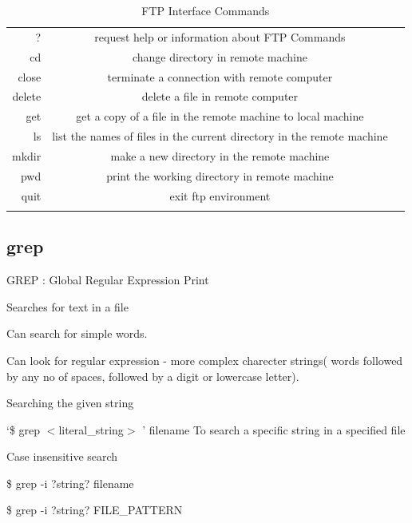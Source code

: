 \documentclass{article}
\begin{document}
\begin{table}[htb]
\caption {FTP Interface Commands}
\label {Common Commands}
\begin{tabular}{rcc}
\noalign{\smallskip}\hline\hline\noalign{\smallskip}
? & request help or information about FTP Commands\\
cd & change directory in remote machine\\
close & terminate a connection with remote computer\\
delete & delete a file in remote computer\\
get & get a copy of a file in the remote machine to local machine\\
ls & list the names of files in the current directory in the remote machine\\
mkdir & make a new directory in the remote machine\\
pwd & print the working directory in remote machine\\
quit & exit ftp environment\\
\noalign{\smallskip}\hline\hline\noalign{\smallskip}

\end{tabular}
\end{table}

\subsection{grep}

GREP : Global Regular Expression Print

 	\hspace{10mm}Searches for text in a file
	
 	\hspace{10mm}Can search for simple words.
	
 	\hspace{10mm}Can look for regular expression - more complex charecter strings( words followed by any no of spaces, followed by a digit or lowercase letter).


	Searching the given string

		     \hspace{10mm}`\$ grep $<$literal\_string$>$ ' filename To search a specific string in a specified file


	Case insensitive search
	
			        \hspace{10mm}\$ grep -i ?string? filename
			        
       				\hspace{10mm}\$ grep -i ?string? FILE\_PATTERN\*
				
\end{document}
